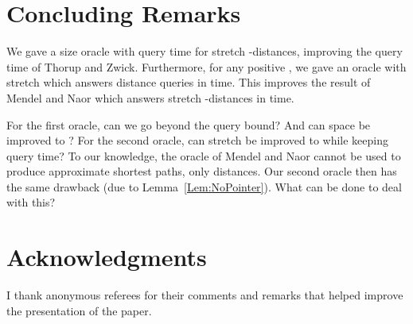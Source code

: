 \documentclass[11pt]{article}
\begin{document}
\section{Concluding Remarks}\label{sec:ConclRem}
We gave a size  oracle with  query time for stretch -distances, improving the  query time
of Thorup and Zwick. Furthermore, for any positive , we gave an oracle with stretch  which answers
distance queries in  time. This improves the result of Mendel and Naor which answers stretch
-distances in  time.

For the first oracle, can we go beyond the  query bound? And can space be improved to ?
For the second oracle, can stretch be improved to  while
keeping  query time? To our knowledge, the oracle of Mendel and Naor cannot be used to produce approximate shortest
paths, only distances. Our second oracle then has the same drawback (due to Lemma~\ref{Lem:NoPointer}). What can be done to deal
with this?

\section*{Acknowledgments}
I thank anonymous referees for their comments and remarks that helped improve
the presentation of the paper.
\end{document}
